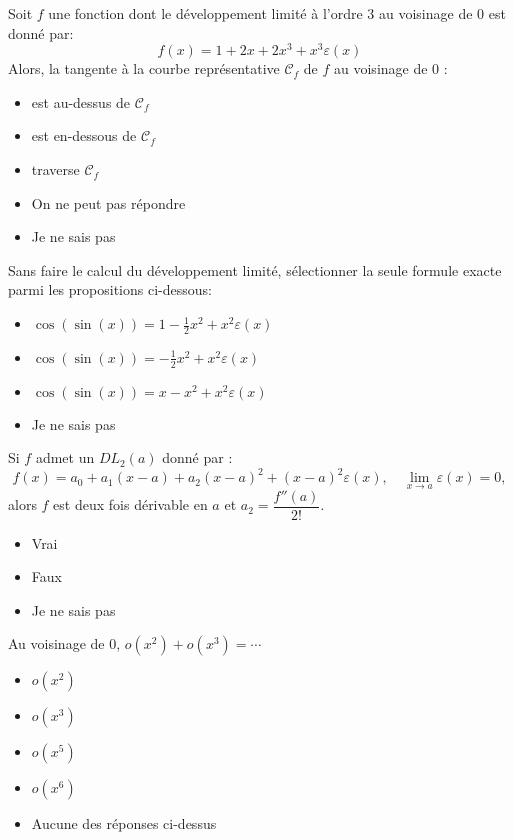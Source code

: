 \begin{clickers}
    Soit \(f\) une fonction dont le développement limité à l'ordre \(3\) au voisinage de \(0\) est donné par:
    \[ f(x) = 1+2x + 2x^3 + x^3\varepsilon(x)\]
    Alors, la tangente à la courbe représentative \(\mathscr{C}_f\) de \(f\) au voisinage de \(0\) :
    \begin{itemize}
        \item est au-dessus de \(\mathscr{C}_f\)
        \item est en-dessous de \(\mathscr{C}_f\)
        \item traverse \(\mathscr{C}_f\)
        \item On ne peut pas répondre
        \item Je ne sais pas
    \end{itemize}
\end{clickers}


\begin{clickers}
    Sans faire le calcul du développement limité, sélectionner la seule formule exacte parmi les propositions ci-dessous:
    \begin{itemize}
        \item \(\displaystyle\cos(\sin(x)) = 1 - \frac{1}{2}x^2 +x^2\varepsilon(x)\)
        \item \(\displaystyle\cos(\sin(x)) = -\frac{1}{2}x^2 +x^2\varepsilon(x)\)
        \item \(\displaystyle\cos(\sin(x)) = x-x^2 +x^2\varepsilon(x)\)
        \item Je ne sais pas
    \end{itemize}
\end{clickers}


\begin{clickers}
    Si \(f\) admet un \(DL_2(a)\) donné par :
    \[ f(x) = a_0 + a_1 (x-a) + a_2 (x-a)^2 + (x-a)^2 \varepsilon(x), \quad \underset{x\to a}{\lim}\varepsilon(x)=0,\]
    alors \(f\) est deux fois dérivable en \(a\) et \(a_2=\dfrac{f''(a)}{2!}\).
    \begin{itemize}
        \item Vrai
        \item Faux
        \item Je ne sais pas
    \end{itemize}
\end{clickers}


\begin{clickers}
    Au voisinage de \(0\), \(o(x^2)+o(x^3)=\cdots\)
    \begin{itemize}
        \item \(o(x^2)\)
        \item \(o(x^3)\)
        \item \(o(x^5)\)
        \item \(o(x^6)\)
        \item Aucune des réponses ci-dessus
    \end{itemize}
\end{clickers}

